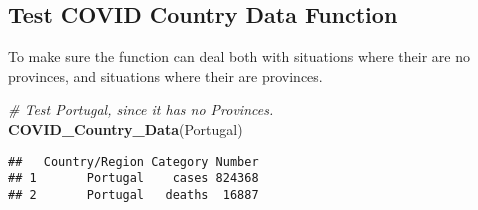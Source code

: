 \documentclass[]{tufte-handout}
\newenvironment{Shaded}{}{}
\newcommand{\CommentTok}[1]{\textcolor[rgb]{0.38,0.63,0.69}{\textit{#1}}}
\newcommand{\ControlFlowTok}[1]{\textcolor[rgb]{0.00,0.44,0.13}{\textbf{#1}}}
\newcommand{\DataTypeTok}[1]{\textcolor[rgb]{0.56,0.13,0.00}{#1}}
\newcommand{\DecValTok}[1]{\textcolor[rgb]{0.25,0.63,0.44}{#1}}
\newcommand{\KeywordTok}[1]{\textcolor[rgb]{0.00,0.44,0.13}{\textbf{#1}}}
\newcommand{\NormalTok}[1]{#1}
\newcommand{\OperatorTok}[1]{\textcolor[rgb]{0.40,0.40,0.40}{#1}}
\newcommand{\StringTok}[1]{\textcolor[rgb]{0.25,0.44,0.63}{#1}}
\begin{document}
\begin{Shaded}
\end{Shaded}

\hypertarget{test-covid-country-data-function}{%
\subsection{Test COVID Country Data
Function}\label{test-covid-country-data-function}}

To make sure the function can deal both with situations where their are
no provinces, and situations where their are provinces.

\begin{Shaded}
\begin{Highlighting}[]
\CommentTok{# Test Portugal, since it has no Provinces.}
\KeywordTok{COVID_Country_Data}\NormalTok{(Portugal)}
\end{Highlighting}
\end{Shaded}

\begin{verbatim}
##   Country/Region Category Number
## 1       Portugal    cases 824368
## 2       Portugal   deaths  16887
\end{verbatim}
\end{document}
